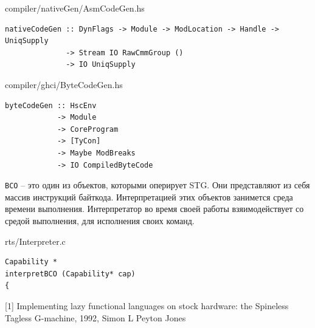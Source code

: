 \documentclass[fontsize=14pt, paper=a4, pagesize, DIV=calc]{scrartcl}
\def\code#1{\texttt{#1}}
\begin{document}
\begin{ListingEnv}
\caption{compiler/nativeGen/AsmCodeGen.hs}
\begin{lstlisting}[firstnumber=108]
nativeCodeGen :: DynFlags -> Module -> ModLocation -> Handle -> UniqSupply
              -> Stream IO RawCmmGroup ()
              -> IO UniqSupply
\end{lstlisting}
\end{ListingEnv}

\begin{ListingEnv}
\caption{compiler/ghci/ByteCodeGen.hs}
\begin{lstlisting}[firstnumber=81]
byteCodeGen :: HscEnv
            -> Module
            -> CoreProgram
            -> [TyCon]
            -> Maybe ModBreaks
            -> IO CompiledByteCode
\end{lstlisting}
\end{ListingEnv}

\code{BCO} -- это один из объектов, которыми оперирует STG. Они представляют из
себя массив инструкций байткода. Интерпретацией этих объектов занимется среда
времени выполнения. Интерпретатор во время своей работы взяимодействует со
средой выполнения, для исполнения своих команд.

\begin{ListingEnv}
\caption{rts/Interpreter.c}
\begin{lstlisting}[firstnumber=295]
Capability *
interpretBCO (Capability* cap)
{
\end{lstlisting}
\end{ListingEnv}

[1] Implementing lazy functional languages on stock hardware:
the Spineless Tagless G-machine, 1992, Simon L Peyton Jones
\end{document}
